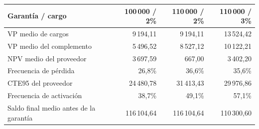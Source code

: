 \begin{tabular}{@{}lrrr@{}}
\toprule
Garantía / cargo & 100\,000 / 2\% & 110\,000 / 2\% & 110\,000 / 3\% \\
\midrule
VP medio de cargos & 9\,194,11 & 9\,194,11 & 13\,524,42 \\
VP medio del complemento & 5\,496,52 & 8\,527,12 & 10\,122,21 \\
NPV medio del proveedor & 3\,697,59 & 667,00 & 3\,402,20 \\
Frecuencia de pérdida & 26,8\% & 36,6\% & 35,6\% \\
CTE95 del proveedor & 24\,480,78 & 31\,413,43 & 29\,976,86 \\
Frecuencia de activación & 38,7\% & 49,1\% & 57,1\% \\
Saldo final medio antes de la garantía & 116\,104,64 & 116\,104,64 & 110\,300,60 \\
\bottomrule
\end{tabular}
